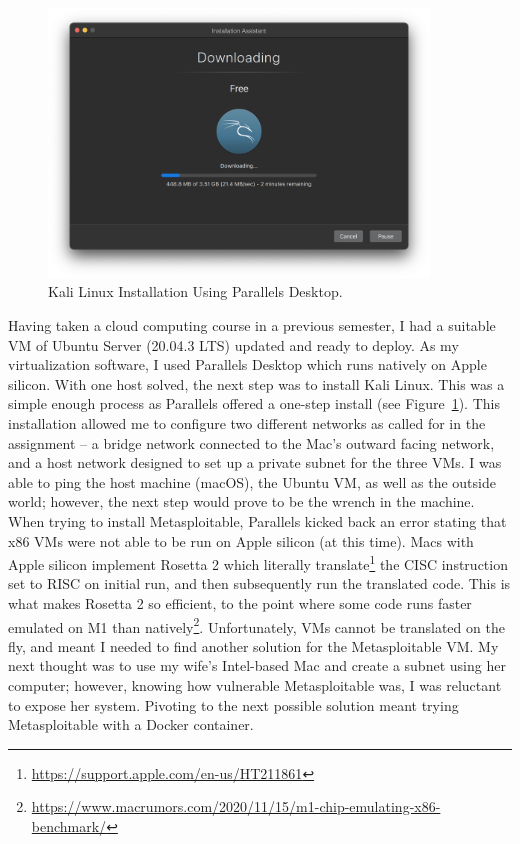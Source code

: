 \documentclass[12pt]{article}
\begin{document}
\begin{figure}[!ht]
    \centering
    \includegraphics[width=0.9\textwidth]{figure01.png}\vspace{-1em}
    \caption{Kali Linux Installation Using Parallels Desktop.}
    \label{fig:Kali}
\end{figure}

Having taken a cloud computing course in a previous semester, I had a suitable VM of Ubuntu Server (20.04.3 LTS) updated and ready to deploy. As my virtualization software, I used Parallels Desktop which runs natively on Apple silicon. With one host solved, the next step was to install Kali Linux. This was a simple enough process as Parallels offered a one-step install (see Figure~\ref{fig:Kali}). This installation allowed me to configure two different networks as called for in the assignment -- a bridge network connected to the Mac's outward facing network, and a host network designed to set up a private subnet for the three VMs. I was able to ping the host machine (macOS), the Ubuntu VM, as well as the outside world; however, the next step would prove to be the wrench in the machine. When trying to install Metasploitable, Parallels kicked back an error stating that x86 VMs were not able to be run on Apple silicon (at this time). Macs with Apple silicon implement Rosetta 2 which literally translate\footnote{\href{https://support.apple.com/en-us/HT211861}{https://support.apple.com/en-us/HT211861}} the CISC instruction set to RISC on initial run, and then subsequently run the translated code. This is what makes Rosetta 2 so efficient, to the point where some code runs faster emulated on M1 than natively\footnote{\href{https://www.macrumors.com/2020/11/15/m1-chip-emulating-x86-benchmark/}{https://www.macrumors.com/2020/11/15/m1-chip-emulating-x86-benchmark/}}. Unfortunately, VMs cannot be translated on the fly, and meant I needed to find another solution for the Metasploitable VM. My next thought was to use my wife's Intel-based Mac and create a subnet using her computer; however, knowing how vulnerable Metasploitable was, I was reluctant to expose her system. Pivoting to the next possible solution meant trying Metasploitable with a Docker container.
\end{document}

